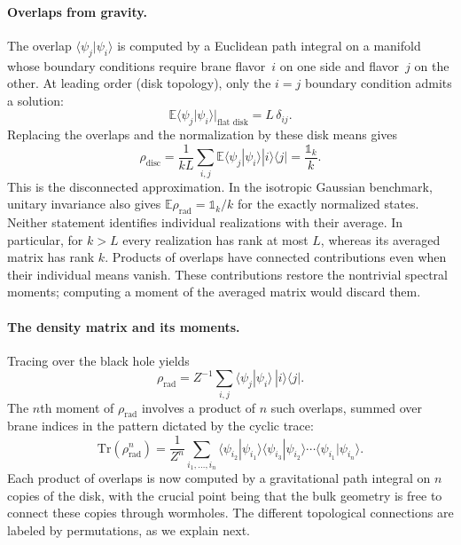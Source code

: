 \documentclass[11pt,letterpaper]{article}
\theoremstyle{plain}
\theoremstyle{definition}
\theoremstyle{remark}
\begin{document}
\paragraph{Overlaps from gravity.}
The overlap $\langle \psi_j | \psi_i \rangle$ is computed by a Euclidean path
integral on a manifold whose boundary conditions require brane flavor~$i$ on one
side and flavor~$j$ on the other.  At leading order (disk topology), only the
$i = j$ boundary condition admits a solution:
\begin{equation}
\label{eq06:overlap_disk}
\mathbb E\langle \psi_j | \psi_i \rangle\big|_{\text{flat disk}} = L \, \delta_{ij}.
\end{equation}
Replacing the overlaps and the normalization by these disk means gives
\begin{equation}
\label{eq06:rho_rad_leading}
 \rho_{\mathrm{disc}}
 =\frac{1}{kL}\sum_{i,j}\mathbb E\langle\psi_j|\psi_i\rangle
 |i\rangle\langle j|=\frac{\mathbb 1_k}{k}.
\end{equation}
This is the disconnected approximation. In the isotropic Gaussian benchmark,
unitary invariance also gives $\mathbb E\rho_{\mathrm{rad}}=\mathbb 1_k/k$
for the exactly normalized states. Neither statement identifies individual
realizations with their average. In particular, for $k>L$ every realization
has rank at most $L$, whereas its averaged matrix has rank $k$.
Products of overlaps have connected contributions even when their individual
means vanish.  These contributions restore the nontrivial spectral moments;
computing a moment of the averaged matrix would discard them.

\paragraph{The density matrix and its moments.}
Tracing over the black hole yields
\begin{equation*}
\rho_{\mathrm{rad}} = Z^{-1} \sum_{i,j}
\langle\psi_j|\psi_i\rangle\,|i\rangle\langle j|.
\end{equation*}
The $n$th moment of $\rho_{\mathrm{rad}}$ involves a product of $n$ such
overlaps, summed over brane indices in the pattern dictated by the cyclic trace:
\begin{equation}
\label{eq06:trace_rho_n}
\mathrm{Tr}(\rho_{\mathrm{rad}}^n)
  = \frac{1}{Z^n} \sum_{i_1, \ldots, i_n}
    \langle \psi_{i_2}|\psi_{i_1}\rangle
    \langle \psi_{i_3}|\psi_{i_2}\rangle
    \cdots
    \langle \psi_{i_1}|\psi_{i_n}\rangle.
\end{equation}
Each product of overlaps is now computed by a gravitational path integral on
$n$ copies of the disk, with the crucial point being that the bulk geometry is
free to connect these copies through wormholes.  The different topological
connections are labeled by permutations, as we explain next.
\end{document}
